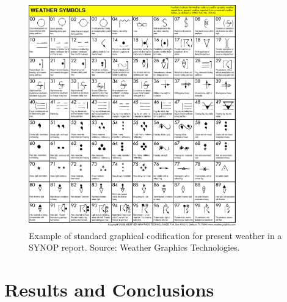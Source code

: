 \documentclass{article}
\begin{document}
\begin{figure}[h]
\begin{center}
\includegraphics[width=0.8\textwidth]{Figs/wxcode1.png}
\caption{Example of standard graphical codification for present weather in a SYNOP report. Source: Weather Graphics Technologies.}\label{fig_synop_symbols_3}
\end{center}
\end{figure}


\newpage
\section{Results and Conclusions}


\nocite{WinNT}



%



\end{document}
